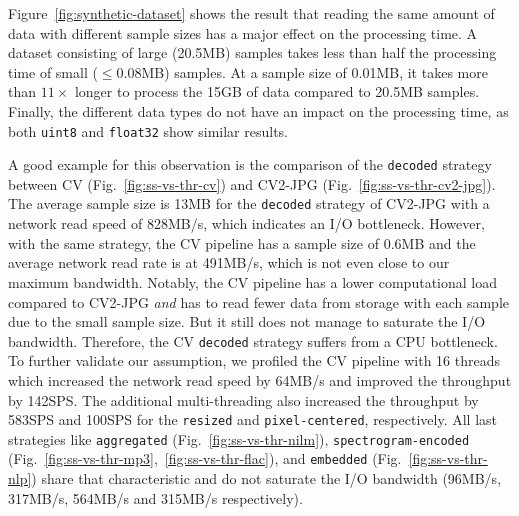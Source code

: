 {\color{diff}
Figure~\ref{fig:synthetic-dataset} shows the result that reading the same amount of data with different sample sizes has a major effect on the processing time.
A dataset consisting of large (20.5\:MB) samples takes less than half the processing time of small ($\leq0.08$\:MB) samples.
At a sample size of 0.01\:MB, it takes more than $11\times$ longer to process the 15\:GB of data compared to 20.5\:MB samples.
Finally, the different data types do not have an impact on the processing time, as both \texttt{uint8} and \texttt{float32} show similar results.

A good example for this observation is the comparison of the \texttt{decoded} strategy between CV (Fig.~\ref{fig:ss-vs-thr-cv}) and CV2-JPG (Fig.~\ref{fig:ss-vs-thr-cv2-jpg}).
The average sample size is 13\:MB for the \texttt{decoded} strategy of CV2-JPG with a network read speed of 828\:MB/s, which indicates an I/O bottleneck.
However, with the same strategy, the CV pipeline has a sample size of 0.6\:MB and the average network read rate is at 491\:MB/s, which is not even close to our maximum bandwidth.
Notably, the CV pipeline has a lower computational load compared to CV2-JPG \textit{and} has to read fewer data from storage with each sample due to the small sample size.
But it still does not manage to saturate the I/O bandwidth.
Therefore, the CV \texttt{decoded} strategy suffers from a CPU bottleneck.
To further validate our assumption, we profiled the CV pipeline with 16 threads which increased the network read speed by 64\:MB/s and improved the throughput by 142\:SPS.
The additional multi-threading also increased the throughput by 583\:SPS and 100\:SPS for the \texttt{resized} and \texttt{pixel-centered}, respectively.
All last strategies like \texttt{aggregated} (Fig.~\ref{fig:ss-vs-thr-nilm}), \texttt{spectrogram-encoded} (Fig.~\ref{fig:ss-vs-thr-mp3},~\ref{fig:ss-vs-thr-flac}), and \texttt{embedded} (Fig.~\ref{fig:ss-vs-thr-nlp}) share that characteristic and do not saturate the I/O bandwidth (96\:MB/s, 317\:MB/s, 564\:MB/s and 315\:MB/s respectively).

}

